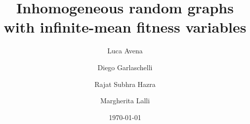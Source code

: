 \documentclass[11pt, reqno]{amsart}
\numberwithin{equation}{section}
\theoremstyle{plain} %
\theoremstyle{definition} %
\begin{document}
\title[Inhomogeneous random graphs with infinite-mean fitness]{Inhomogeneous random graphs \\ with infinite-mean fitness variables}

\author[L.~Avena]{Luca Avena} 
\address{{ Leiden University, Mathematical Institute, Niels Bohrweg 1 2333 CA, Leiden. The Netherlands. \&
Dipartimento di Matematica e Informatica "Ulisse Dini" - Universit\`a degli Studi di Firenze, Italy}}
\author[D. Garlaschelli]{Diego Garlaschelli}
\address{Lorentz Institute for Theoretical Physics, Leiden University, P.O.\  Box 9504, 2300 RA Leiden, The Netherlands
\& IMT School for Advanced Studies, Piazza S.\ Francesco 19, 55100 Lucca, Italy
\& INdAM-GNAMPA Istituto Nazionale di Alta Matematica, Italy}
\author[R.~S.~Hazra]{Rajat Subhra Hazra}
\address{University of Leiden, Niels Bohrweg 1, 2333 CA, Leiden, The Netherlands}
\author[M.~Lalli]{Margherita Lalli}
\address{IMT School for Advanced Studies, Piazza S.\ Francesco 19, 55100 Lucca, Italy}



\date{\today}
\end{document}
